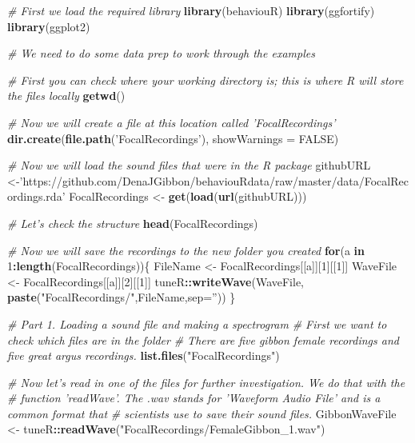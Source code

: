 \documentclass[]{book}
\newenvironment{Shaded}{\begin{snugshade}}{\end{snugshade}}
\newcommand{\CommentTok}[1]{\textcolor[rgb]{0.56,0.35,0.01}{\textit{#1}}}
\newcommand{\ControlFlowTok}[1]{\textcolor[rgb]{0.13,0.29,0.53}{\textbf{#1}}}
\newcommand{\DataTypeTok}[1]{\textcolor[rgb]{0.13,0.29,0.53}{#1}}
\newcommand{\DecValTok}[1]{\textcolor[rgb]{0.00,0.00,0.81}{#1}}
\newcommand{\KeywordTok}[1]{\textcolor[rgb]{0.13,0.29,0.53}{\textbf{#1}}}
\newcommand{\NormalTok}[1]{#1}
\newcommand{\OperatorTok}[1]{\textcolor[rgb]{0.81,0.36,0.00}{\textbf{#1}}}
\newcommand{\OtherTok}[1]{\textcolor[rgb]{0.56,0.35,0.01}{#1}}
\newcommand{\StringTok}[1]{\textcolor[rgb]{0.31,0.60,0.02}{#1}}
\begin{document}
\begin{Shaded}
\begin{Highlighting}[]
\CommentTok{# First we load the required library}
\KeywordTok{library}\NormalTok{(behaviouR)}
\KeywordTok{library}\NormalTok{(ggfortify) }
\KeywordTok{library}\NormalTok{(ggplot2)}

\CommentTok{# We need to do some data prep to work through the examples}

\CommentTok{# First you can check where your working directory is; this is where R will store the files locally}
\KeywordTok{getwd}\NormalTok{()}

\CommentTok{# Now we will create a file at this location called 'FocalRecordings'}
\KeywordTok{dir.create}\NormalTok{(}\KeywordTok{file.path}\NormalTok{(}\StringTok{'FocalRecordings'}\NormalTok{), }\DataTypeTok{showWarnings =} \OtherTok{FALSE}\NormalTok{)}

\CommentTok{# Now we will load the sound files that were in the R package}
\NormalTok{githubURL <-}\StringTok{'https://github.com/DenaJGibbon/behaviouRdata/raw/master/data/FocalRecordings.rda'}
\NormalTok{FocalRecordings <-}\StringTok{ }\KeywordTok{get}\NormalTok{(}\KeywordTok{load}\NormalTok{(}\KeywordTok{url}\NormalTok{(githubURL)))}

\CommentTok{# Let's check the structure}
\KeywordTok{head}\NormalTok{(FocalRecordings)}

\CommentTok{# Now we will save the recordings to the new folder you created}
\ControlFlowTok{for}\NormalTok{(a }\ControlFlowTok{in} \DecValTok{1}\OperatorTok{:}\KeywordTok{length}\NormalTok{(FocalRecordings))\{}
\NormalTok{  FileName <-}\StringTok{ }\NormalTok{FocalRecordings[[a]][}\DecValTok{1}\NormalTok{][[}\DecValTok{1}\NormalTok{]]}
\NormalTok{  WaveFile <-}\StringTok{ }\NormalTok{FocalRecordings[[a]][}\DecValTok{2}\NormalTok{][[}\DecValTok{1}\NormalTok{]]}
\NormalTok{  tuneR}\OperatorTok{::}\KeywordTok{writeWave}\NormalTok{(WaveFile, }\KeywordTok{paste}\NormalTok{(}\StringTok{"FocalRecordings/"}\NormalTok{,FileName,}\DataTypeTok{sep=}\StringTok{''}\NormalTok{))}
\NormalTok{\}}


\CommentTok{# Part 1. Loading a sound file and making a spectrogram}
\CommentTok{# First we want to check which files are in the folder}
\CommentTok{# There are five gibbon female recordings and five great argus recordings.}
\KeywordTok{list.files}\NormalTok{(}\StringTok{"FocalRecordings"}\NormalTok{)}

\CommentTok{# Now let's read in one of the files for further investigation. We do that with the}
\CommentTok{# function 'readWave'. The .wav stands for 'Waveform Audio File' and is a common format that}
\CommentTok{# scientists use to save their sound files.}
\NormalTok{GibbonWaveFile <-}\StringTok{ }\NormalTok{tuneR}\OperatorTok{::}\KeywordTok{readWave}\NormalTok{(}\StringTok{"FocalRecordings/FemaleGibbon_1.wav"}\NormalTok{)}


\end{Highlighting}
\end{Shaded}
\end{document}
